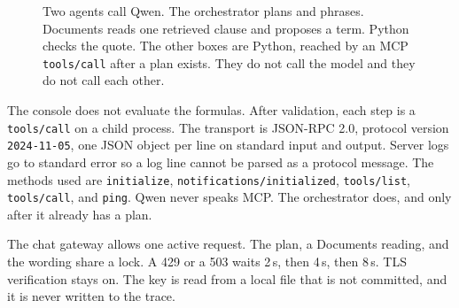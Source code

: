 \documentclass[11pt,a4paper]{article}
\begin{document}
\begin{figure}[ht]
\centering
{}
\caption{Two agents call Qwen. The orchestrator plans and phrases. Documents reads one retrieved clause and proposes a term. Python checks the quote. The other boxes are Python, reached by an MCP \texttt{tools/call} after a plan exists. They do not call the model and they do not call each other.}
\end{figure}

The console does not evaluate the formulas. After validation, each step is a \texttt{tools/call} on a child process. The transport is JSON-RPC 2.0, protocol version \texttt{2024-11-05}, one JSON object per line on standard input and output. Server logs go to standard error so a log line cannot be parsed as a protocol message. The methods used are \texttt{initialize}, \texttt{notifications/initialized}, \texttt{tools/list}, \texttt{tools/call}, and \texttt{ping}. Qwen never speaks MCP. The orchestrator does, and only after it already has a plan.

The chat gateway allows one active request. The plan, a Documents reading, and the wording share a lock. A 429 or a 503 waits 2\,s, then 4\,s, then 8\,s. TLS verification stays on. The key is read from a local file that is not committed, and it is never written to the trace.
\end{document}
